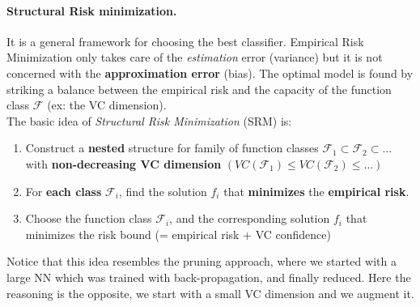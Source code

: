 \paragraph*{Structural Risk minimization.} It is a general framework for choosing the best classifier. Empirical Risk Minimization only takes care of the \textit{estimation} error (variance) but it is not concerned with the \textbf{approximation error} (bias). The optimal model is found by striking a balance between the empirical risk and the capacity of the function class $\mathcal{ F }$ (ex: the VC dimension).\\
The basic idea of \textit{Structural Risk Minimization} (SRM) is:
\begin{enumerate}
	\item Construct a \textbf{nested} structure for family of function classes $\mathcal{ F }_1 \subset \mathcal{ F }_2 \subset \dots$ with \textbf{non-decreasing VC dimension} $(VC(\mathcal{ F }_1) \leq VC(\mathcal{ F }_2) \leq \dots)$
	\item For \textbf{each class} $\mathcal{ F }_i$, find the solution $f_i$ that \textbf{minimizes} the \textbf{empirical risk}.
	\item Choose the function class $\mathcal{ F }_i$, and the corresponding solution $f_i$ that minimizes the risk bound (= empirical risk + VC confidence) 
\end{enumerate}

Notice that this idea resembles the pruning approach, where we started with a large NN which was trained with back-propagation, and finally reduced. Here the reasoning is the opposite, we start with a small VC dimension and we augment it. 


